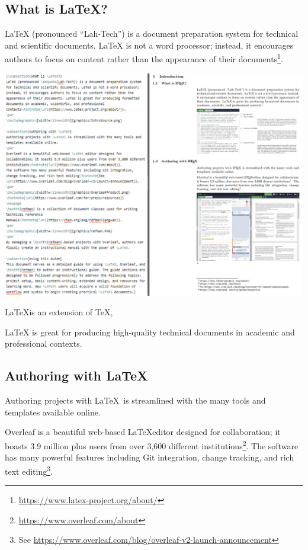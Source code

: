
\subsection{What is \LaTeX?}
LaTeX (pronounced \enquote{Lah-Tech}) is a document preparation system for technical and scientiﬁc documents. LaTeX is not a word processor; instead, it encourages authors to focus on content rather than the appearance of their documents\footnote{\url{https://www.latex-project.org/about/}}. 

\begingroup
{}
\endgroup
\includegraphics[width=\linewidth]{graphics/IntroSource.png}

\LaTeX is an extension of \TeX, %

LaTeX is great for producing high-quality technical documents in academic and professional contexts.

\newpage
\subsection{Authoring with \LaTeX}
Authoring projects with \LaTeX\ is streamlined with the many tools and templates available online.
\par
Overleaf is a beautiful web-based \LaTeX editor designed for collaboration; it boasts 3.9 million plus users from over 3,600 diﬀerent institutions\footnote{\url{https://www.overleaf.com/about}}.
The software has many powerful features including Git integration, change tracking, and rich text editing\footnote{See \url{https://www.overleaf.com/blog/overleaf-v2-launch-announcement}}.

